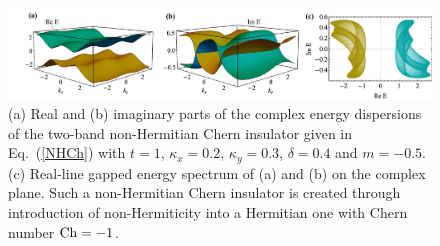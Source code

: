 \documentclass{tADP2e}
\theoremstyle{plain}
\theoremstyle{plain}
\theoremstyle{definition}
\begin{document}
\begin{figure}[!t]
\begin{center}
\includegraphics[width=14.5cm]{./Figures/fig_5_NHCh.pdf}
\end{center}
\caption{(a) Real and (b) imaginary parts of the complex energy dispersions of the two-band non-Hermitian Chern insulator given in Eq.~(\ref{NHCh}) with $t=1$, $\kappa_x=0.2$, $\kappa_y=0.3$, $\delta=0.4$ and $m=-0.5$. (c) Real-line gapped energy spectrum of (a) and (b) on the complex plane. 
Such a non-Hermitian Chern insulator is created through introduction of non-Hermiticity into a Hermitian one with Chern number ${\rm Ch}=-1$.}
\label{fig:NHCh}
\end{figure}
\end{document}

